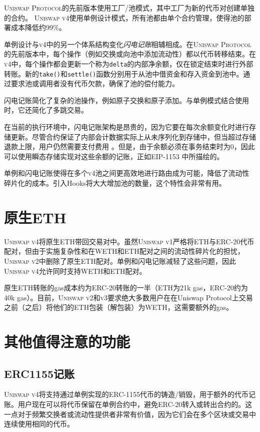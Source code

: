 \documentclass[sigconf,nonacm,prologue,table]{acmart}
\numberwithin{equation}{section}
\theoremstyle{definition}
\theoremstyle{remark}
\begin{document}
\textsc{Uniswap Protocol}的先前版本使用工厂/池模式，其中工厂为新的代币对创建单独的合约。 \textsc{Uniswap v4}使用单例设计模式，所有池都由单个合约管理，使得池的部署成本降低约99\%。

单例设计与\textsc{v4}中的另一个体系结构变化\emph{闪电记账}相辅相成。在\textsc{Uniswap Protocol}的先前版本中，每个操作（例如交换或向池中添加流动性）都以代币转移结束。在\textsc{v4}中，每个操作都会更新一个称为\verb|delta|的内部净余额，仅在锁定结束时进行外部转账。新的\newline \verb|take()|和\verb|settle()|函数分别用于从池中借资金和存入资金到池中。通过要求池或调用者没有代币欠款，确保了池的偿付能力。

闪电记账简化了复杂的池操作，例如原子交换和原子添加。与单例模式结合使用时，它还简化了多跳交易。

在当前的执行环境中，闪电记账架构是昂贵的，因为它要在每次余额变化时进行存储更新。尽管合约保证了内部会计数据实际上从未序列化到存储中，但当超过存储退款上限，用户仍然需要支付费用 \cite{Buterin2021}。但是，由于余额必须在事务结束时为0，因此可以使用瞬态存储实现对这些余额的记账，正如EIP-1153 \cite{Akhunov2018}中所描绘的。

单例和闪电记账使得在多个\textsc{v4}池之间更高效地进行路由成为可能，降低了流动性碎片化的成本。引入Hooks将大大增加池的数量，这个特性会非常有用。

\section{原生ETH} 
\label{nativeeth}

\textsc{Uniswap v4}将原生ETH带回交易对中。虽然\textsc{Uniswap v1}严格将ETH与ERC-20代币配对，但由于实施复杂性和在WETH和ETH配对之间的流动性碎片化的担忧，\textsc{Uniswap v2}中删除了原生ETH配对。单例和闪电记账减轻了这些问题，因此\textsc{Uniswap v4}允许同时支持WETH和ETH配对。

原生ETH转账的gas成本约为ERC-20转账的一半（ETH为21k gas，ERC-20约为40k gas）。目前，\textsc{Uniswap v2}和\textsc{v3}要求绝大多数用户在在Uniswap Protocol上交易之前（之后）将他们的ETH包装（解包装）为WETH，这需要额外的gas。

\section{其他值得注意的功能} 
\label{other}

\subsection{ERC1155记账} 
\textsc{Uniswap v4}将支持通过单例实现的ERC-1155代币的铸造/销毁，用于额外的代币记账。用户现在可以将代币保留在单例合约中，避免ERC-20转入或转出合约的。这一点对于频繁交换者或流动性提供者非常有价值，因为它们会在多个区块或交易中连续使用相同的代币。
\end{document}
